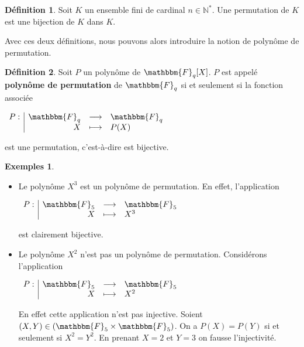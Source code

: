\documentclass[12pt]{article}
\theoremstyle{remark}\newtheorem{note}{Note}
\theoremstyle{remark}\newtheorem{nota}{Notation}
\newcommand{\F}{\mathbbm{F}}
\theoremstyle{definition}
\newtheorem{definition}{Définition}
\newtheorem*{examples}{Exemples}
\begin{document}
\begin{definition}
Soit $K$ un ensemble fini de cardinal $n\in \mathbb{N}^*$. Une permutation de $K$ est une bijection de $K$ dans $K$.
\end{definition}
\vspace{12pt}
Avec ces deux définitions, nous pouvons alors introduire la notion de polynôme de permutation.\\
\begin{definition}
Soit $P$ un polynôme de $\F_q [X]$. $P$ est appelé \textbf{polynôme de permutation} de $\F_q$ si et seulement si la fonction associée
\begin{center}
$
\begin{array}{l|rcl}
\displaystyle
P : & \F _q & \longrightarrow & \F _q \\
    & X & \longmapsto & P(X)
\end{array}
$
\end{center}
est une permutation, c'est-à-dire est bijective.
\end{definition}
\vspace{24pt}
\begin{examples}
	\begin{itemize}
On se place dans $\F_5$.\\
\item[1.] Le polynôme $X^3$ est un polynôme de permutation. En effet, l'application\\
\begin{center}
$
\begin{array}{l|rcl}
\displaystyle
P : & \F _5 & \longrightarrow & \F _5 \\
    & X & \longmapsto & X^3
\end{array}
$
\end{center}
\vspace{10pt}
est clairement bijective.\\
\item[2.] Le polynôme $X^2$ n'est pas un polynôme de permutation. Considérons l'application \\
\begin{center}
$
\begin{array}{l|rcl}
\displaystyle
P : & \F _5 & \longrightarrow & \F _5 \\
    & X & \longmapsto & X^2
\end{array}
$
\end{center}
\vspace{12pt}
En effet cette application n'est pas injective. Soient $(X,Y) \in (\F_5 \times \F_5)$. On a $P(X)=P(Y)$ si et seulement si $X^2=Y^2$. En prenant $X=2$ et $Y=3$ on fausse l'injectivité.
	\end{itemize}
\end{examples}
\end{document}
